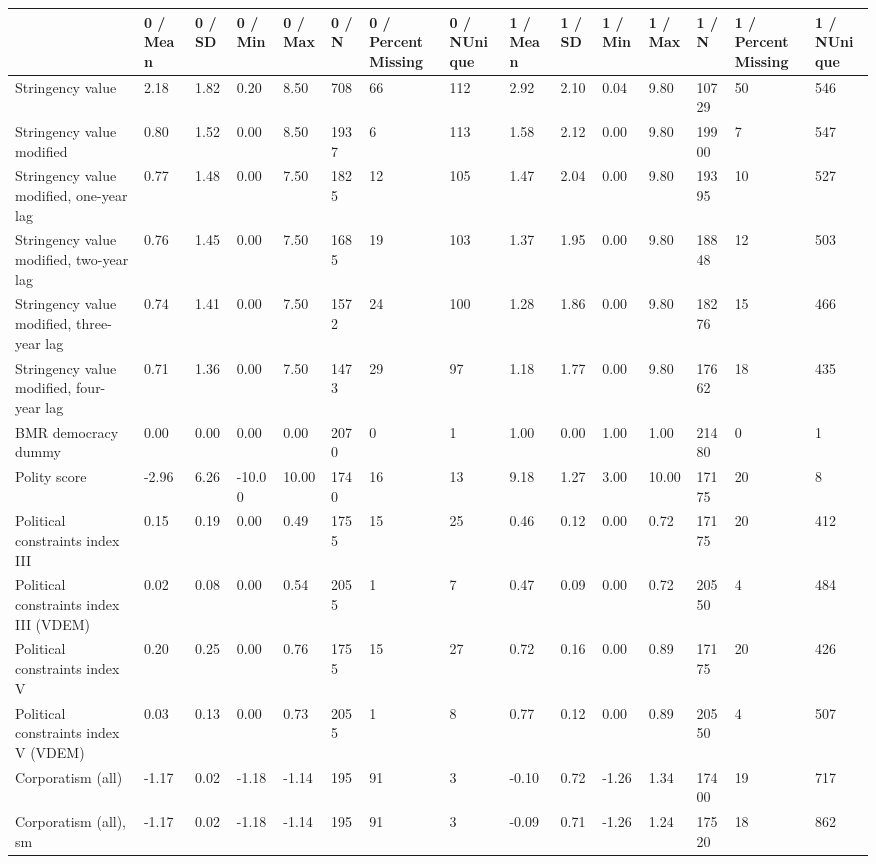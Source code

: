 
\begin{longtable}{lllllllllllllll}
\toprule
  & 0 / Mean & 0 / SD & 0 / Min & 0 / Max & 0 / N & 0 / PercentMissing & 0 / NUnique & 1 / Mean & 1 / SD & 1 / Min & 1 / Max & 1 / N & 1 / PercentMissing & 1 / NUnique\\
\midrule
Stringency value & 2.18 & 1.82 & 0.20 & 8.50 & 708 & 66 & 112 & 2.92 & 2.10 & 0.04 & 9.80 & 10729 & 50 & 546\\
Stringency value modified & 0.80 & 1.52 & 0.00 & 8.50 & 1937 & 6 & 113 & 1.58 & 2.12 & 0.00 & 9.80 & 19900 & 7 & 547\\
Stringency value modified, one-year lag & 0.77 & 1.48 & 0.00 & 7.50 & 1825 & 12 & 105 & 1.47 & 2.04 & 0.00 & 9.80 & 19395 & 10 & 527\\
Stringency value modified, two-year lag & 0.76 & 1.45 & 0.00 & 7.50 & 1685 & 19 & 103 & 1.37 & 1.95 & 0.00 & 9.80 & 18848 & 12 & 503\\
Stringency value modified, three-year lag & 0.74 & 1.41 & 0.00 & 7.50 & 1572 & 24 & 100 & 1.28 & 1.86 & 0.00 & 9.80 & 18276 & 15 & 466\\
\addlinespace
Stringency value modified, four-year lag & 0.71 & 1.36 & 0.00 & 7.50 & 1473 & 29 & 97 & 1.18 & 1.77 & 0.00 & 9.80 & 17662 & 18 & 435\\
BMR democracy dummy & 0.00 & 0.00 & 0.00 & 0.00 & 2070 & 0 & 1 & 1.00 & 0.00 & 1.00 & 1.00 & 21480 & 0 & 1\\
Polity score & -2.96 & 6.26 & -10.00 & 10.00 & 1740 & 16 & 13 & 9.18 & 1.27 & 3.00 & 10.00 & 17175 & 20 & 8\\
Political constraints index III & 0.15 & 0.19 & 0.00 & 0.49 & 1755 & 15 & 25 & 0.46 & 0.12 & 0.00 & 0.72 & 17175 & 20 & 412\\
Political constraints index III (VDEM) & 0.02 & 0.08 & 0.00 & 0.54 & 2055 & 1 & 7 & 0.47 & 0.09 & 0.00 & 0.72 & 20550 & 4 & 484\\
\addlinespace
Political constraints index V & 0.20 & 0.25 & 0.00 & 0.76 & 1755 & 15 & 27 & 0.72 & 0.16 & 0.00 & 0.89 & 17175 & 20 & 426\\
Political constraints index V (VDEM) & 0.03 & 0.13 & 0.00 & 0.73 & 2055 & 1 & 8 & 0.77 & 0.12 & 0.00 & 0.89 & 20550 & 4 & 507\\
Corporatism (all) & -1.17 & 0.02 & -1.18 & -1.14 & 195 & 91 & 3 & -0.10 & 0.72 & -1.26 & 1.34 & 17400 & 19 & 717\\
Corporatism (all), sm & -1.17 & 0.02 & -1.18 & -1.14 & 195 & 91 & 3 & -0.09 & 0.71 & -1.26 & 1.24 & 17520 & 18 & 862\\

\end{longtable}
